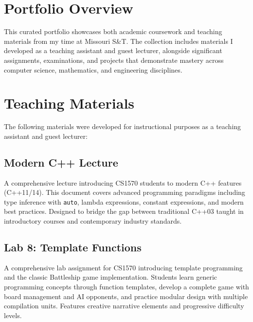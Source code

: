 \documentclass{mst}
\begin{document}


\setcounter{page}{1} %
\makecustomtoc

\pagestyle{fancy}

\clearpage
\section*{Portfolio Overview}

\noindent This curated portfolio showcases both academic coursework and teaching materials from my time at Missouri S\&T. The collection includes materials I developed as a teaching assistant and guest lecturer, alongside significant assignments, examinations, and projects that demonstrate mastery across computer science, mathematics, and engineering disciplines.

\section*{Teaching Materials}

The following materials were developed for instructional purposes as a teaching assistant and guest lecturer:

\subsection*{Modern C++ Lecture}
A comprehensive lecture introducing CS1570 students to modern C++ features (C++11/14). This document covers advanced programming paradigms including type inference with \texttt{auto}, lambda expressions, constant expressions, and modern best practices. Designed to bridge the gap between traditional C++03 taught in introductory courses and contemporary industry standards.

\subsection*{Lab 8: Template Functions}
A comprehensive lab assignment for CS1570 introducing template programming and the classic Battleship game implementation. Students learn generic programming concepts through function templates, develop a complete game with board management and AI opponents, and practice modular design with multiple compilation units. Features creative narrative elements and progressive difficulty levels.
\end{document}
